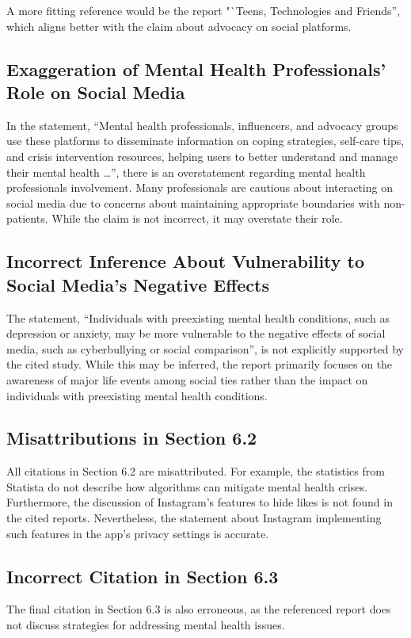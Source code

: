 \documentclass[12pt]{article}
\begin{document}
A more fitting reference would be the report "`Teens, Technologies and Friends'', which aligns better with the claim about advocacy on social platforms.

\subsection{Exaggeration of Mental Health Professionals' Role on Social Media}
In the statement, ``Mental health professionals, influencers, and advocacy groups use these platforms to disseminate information on coping strategies, self-care tips, and crisis intervention resources, helping users to better understand and manage their mental health \dots'', there is an overstatement regarding mental health professionals involvement. Many professionals are cautious about interacting on social media due to concerns about maintaining appropriate boundaries with non-patients. While the claim is not incorrect, it may overstate their role.

\subsection{Incorrect Inference About Vulnerability to Social Media's Negative Effects}
The statement, ``Individuals with preexisting mental health conditions, such as depression or anxiety, may be more vulnerable to the negative effects of social media, such as cyberbullying or social comparison'', is not explicitly supported by the cited study. While this may be inferred, the report primarily focuses on the awareness of major life events among social ties rather than the impact on individuals with preexisting mental health conditions.

\subsection{Misattributions in Section 6.2}
All citations in Section 6.2 are misattributed. For example, the statistics from Statista do not describe how algorithms can mitigate mental health crises. Furthermore, the discussion of Instagram's features to hide likes is not found in the cited reports. Nevertheless, the statement about Instagram implementing such features in the app's privacy settings is accurate.

\subsection{Incorrect Citation in Section 6.3}
The final citation in Section 6.3 is also erroneous, as the referenced report does not discuss strategies for addressing mental health issues.
\end{document}
